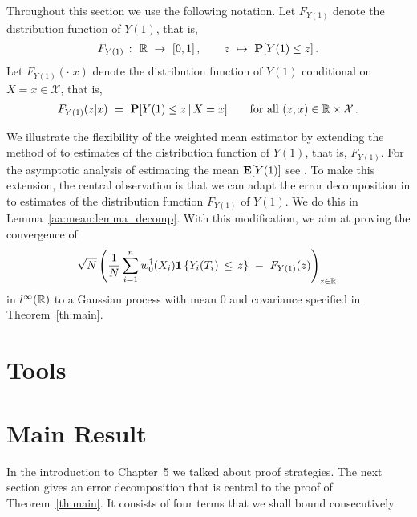 Throughout this section we use the following notation.
Let $F_{Y(1)}$ denote the distribution function of $Y(1)$, that is,
\begin{gather*}
  F_{Y(1)}
  \ 
  \colon
  \ 
  \R
  \ 
  \to
  \ 
  [0,1]
  \, 
  , 
  \qquad
  z
  \ 
  \mapsto
  \ 
  \P
  [
  Y(1)
  \le
  z
  ]
  \,.
\end{gather*}
Let $F_{Y(1)}(\cdot|x)$ denote the distribution function of $Y(1)$ conditional on $X=x\in\mathcal{X}$, that is,
\begin{gather}
  \label{3228}
  F_{Y(1)}
  (z|x)
\ 
  =
\ 
  \P
  [
  Y(1)
  \le
  z
  \,
  |
  \,
  X=x
  ]
  \qquad
  \text{for all}\ 
  (z,x)\in\R\times\mathcal{X}
  \,.
\end{gather}

We illustrate the flexibility of 
the weighted mean estimator by 
extending the method of \cite{Wang2019} to
estimates of 
the distribution function of $Y(1)$, that is, $F_{Y(1)}$.
For the asymptotic analysis of estimating the mean $\mathbf{E}[Y(1)]$ see \cite[Proof of Theorem~3]{Wang2019}.
To make this extension, the central observation is that we can adapt the error decomposition in \cite[page 27]{Wang2019} 
to estimates of the distribution function $F_{Y(1)}$ of $Y(1)$.
We do this in Lemma~\ref{aa:mean:lemma_decomp}.
With this modification, we aim at proving
the convergence of
\begin{gather*}
    \sqrt{N}
    \left( 
  \frac{1}{N}
    \sum_{i=1}^{n} 
    w_0^\dagger(X_i)
    \mathbf{1}\left\{ Y_i(T_i)\,\le\, z \right\}
    \ 
    -
    \ 
    F_{Y(1)}(z)
    \right)
    _{z\in\R}
    \,
  \end{gather*}
  in
  $l^\infty(\mathbb{R})$
  to a Gaussian process with mean 0 and covariance specified in Theorem~\ref{th:main}.
\section{Tools}
  
\section{Main Result}
  
  In the introduction to Chapter~5 we talked about proof strategies. The next section gives an error decomposition that is central to the proof of Theorem~\ref{th:main}.
It consists of four terms that we shall bound consecutively. 
